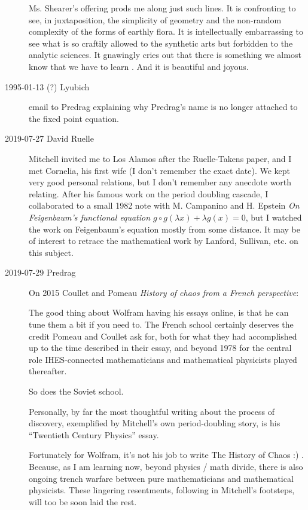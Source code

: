 \begin{description}
Ms. Shearer's offering prods me along just such lines. It is confronting
to see, in juxtaposition, the simplicity of geometry and the non-random
complexity of the forms of earthly flora. It is intellectually
embarrassing to see what is so craftily allowed to the synthetic arts but
forbidden to the analytic sciences. It gnawingly cries out that there is
something we almost know that we have to learn . And it is beautiful and
joyous.


\item[1995-01-13 (?) Lyubich]
email to Predrag explaining why Predrag's name is no longer attached
to the fixed point equation.

\item[2019-07-27 David Ruelle] %
Mitchell invited me to Los Alamos after the Ruelle-Takens paper, and I
met Cornelia, his first wife (I don't remember the exact date).  We kept
very good personal relations, but I don't remember any anecdote worth
relating.  After his famous work on the period doubling cascade, I
collaborated to a small 1982 note with M. Campanino and H.
Epstein {\em On {Feigenbaum}'s functional equation {$g \circ
g(\lambda x) + \lambda g(x) = 0$}}, but I watched the work on
Feigenbaum's equation mostly from some distance.  It may be of interest
to retrace the mathematical work by Lanford, Sullivan, etc. on this
subject.


\item[2019-07-29 Predrag]
On 2015 Coullet and Pomeau
{\em History of chaos from a {French} perspective}:

The good thing about Wolfram having his essays online, is that he can
tune them a bit if you need to. The French school certainly deserves the
credit Pomeau and Coullet ask for, both for what they had accomplished up
to the time described in their essay, and beyond 1978 for the central
role IHES-connected mathematicians and mathematical physicists played
thereafter.

So does the Soviet school.

Personally, by far the most thoughtful writing about the process of
discovery, exemplified by Mitchell's own period-doubling story, is his
``Twentieth Century Physics'' essay.

Fortunately for Wolfram, it's not his job to write The History of Chaos
:) . Because, as I am learning now, beyond physics / math divide, there
is also ongoing trench warfare between pure mathematicians and
mathematical physicists. These lingering resentments, following in
Mitchell's footsteps, will too be soon laid the rest.


\end{description}
